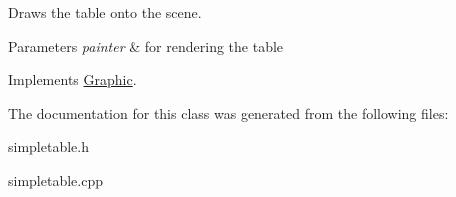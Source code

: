 Draws the table onto the scene. 


\begin{DoxyParams}{Parameters}
{\em painter} & for rendering the table \\
\hline
\end{DoxyParams}


Implements \mbox{\hyperlink{class_graphic_aed0af75ae3756baeb3fe663ae5f36f29}{Graphic}}.



The documentation for this class was generated from the following files\+:\begin{DoxyCompactItemize}
\item 
simpletable.\+h\item 
simpletable.\+cpp\end{DoxyCompactItemize}

